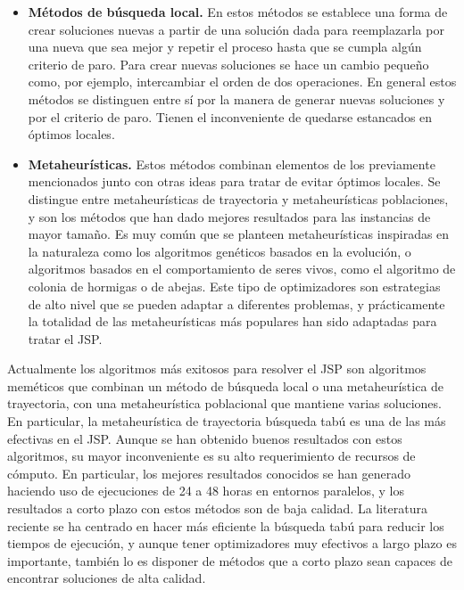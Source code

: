 \begin{itemize}
\item \textbf{Métodos de búsqueda local.} En estos métodos se establece una forma de crear soluciones nuevas a partir de una solución dada para reemplazarla por una nueva 
que sea mejor y repetir el proceso hasta que se cumpla algún criterio de paro.  Para crear nuevas soluciones se hace un cambio pequeño como, por ejemplo, intercambiar el 
orden de dos operaciones.  En general estos métodos se distinguen entre sí por la manera de generar nuevas soluciones y por el criterio de paro. Tienen el inconveniente 
de quedarse estancados en óptimos locales. 

\item \textbf{Metaheurísticas.} Estos métodos combinan elementos de los previamente mencionados junto con otras ideas para tratar de evitar óptimos locales. 
Se distingue entre metaheurísticas de trayectoria y metaheurísticas poblaciones, y son los métodos que han dado mejores resultados para las instancias de mayor
tamaño. 
%
Es muy común que se planteen metaheurísticas inspiradas en la naturaleza como los algoritmos genéticos basados en la evolución, o algoritmos basados en el 
comportamiento de seres vivos, como el algoritmo de colonia de hormigas o de abejas.
%
Este tipo de optimizadores son estrategias de alto nivel que se pueden adaptar a diferentes problemas, y prácticamente la totalidad de las metaheurísticas más populares
han sido adaptadas para tratar el JSP.
\end{itemize}

Actualmente los algoritmos más exitosos para resolver el JSP son algoritmos meméticos que combinan un método de búsqueda local o una metaheurística de trayectoria,
con una metaheurística poblacional que mantiene varias soluciones. 
%
En particular, la metaheurística de trayectoria búsqueda tabú es una de las más efectivas en el JSP.
%
Aunque se han obtenido buenos resultados con estos algoritmos, su mayor inconveniente es su alto requerimiento de recursos de cómputo.
%
En particular, los mejores resultados conocidos se han generado haciendo uso de ejecuciones de 24 a 48 horas en entornos paralelos, y los resultados a corto
plazo con estos métodos son de baja calidad.
%
La literatura reciente se ha centrado en hacer más eficiente la búsqueda tabú para reducir los tiempos de ejecución, y aunque tener optimizadores muy efectivos
a largo plazo es importante, también lo es disponer de métodos que a corto plazo sean capaces de encontrar soluciones de alta calidad.

